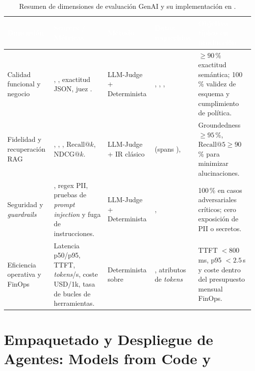 \begin{table}[htbp]
\centering
\caption{Resumen de dimensiones de evaluación GenAI y su implementación en .}
\label{tab:dimensiones-eval-genai}
\small
\begin{tabularx}{\textwidth}{@{}L{2.2cm} L{3.65cm} C{2.1cm} L{2.35cm} Y@{}}
\toprule
{}
\textcolor{white}{\sffamily\bfseries Dimensión} &
\textcolor{white}{\sffamily\bfseries Scorers / Métricas} &
\textcolor{white}{\sffamily\bfseries Método} &
\textcolor{white}{\sffamily\bfseries Datos requeridos} &
\textcolor{white}{\sffamily\bfseries Objetivo típico en producción} \\
\midrule
Calidad funcional y negocio &
, , exactitud JSON, juez . &
LLM-Judge + Determinista &
, , ,  &
$\ge 90$\,\% exactitud semántica; 100\,\% validez de esquema y cumplimiento de política. \\
Fidelidad y recuperación RAG &
, , , $\text{Recall}@k$, $\text{NDCG}@k$. &
LLM-Judge + IR clásico &
 (spans ),  &
Groundedness $\ge 95$\,\%, $\text{Recall}@5 \ge 90$\,\% para minimizar alucinaciones. \\
Seguridad y \textit{guardrails} &
, regex PII, pruebas de \textit{prompt injection} y fuga de instrucciones. &
LLM-Judge + Determinista &
,  &
100\,\% en casos adversariales críticos; cero exposición de PII o secretos. \\
Eficiencia operativa y FinOps &
Latencia p50/p95, TTFT, \textit{tokens}/s, coste USD/1k, tasa de bucles de herramientas. &
Determinista sobre  &
, atributos de \textit{tokens} &
TTFT $< 800$\,ms, p95 $< 2.5$\,s y coste dentro del presupuesto mensual FinOps. \\
\bottomrule
\end{tabularx}
\end{table}

\section[Agentes: Models from Code y ResponsesAgent]{Empaquetado y Despliegue de Agentes: Models from Code y \texorpdfstring{}{ResponsesAgent}}\label{sec:agents-responses}

